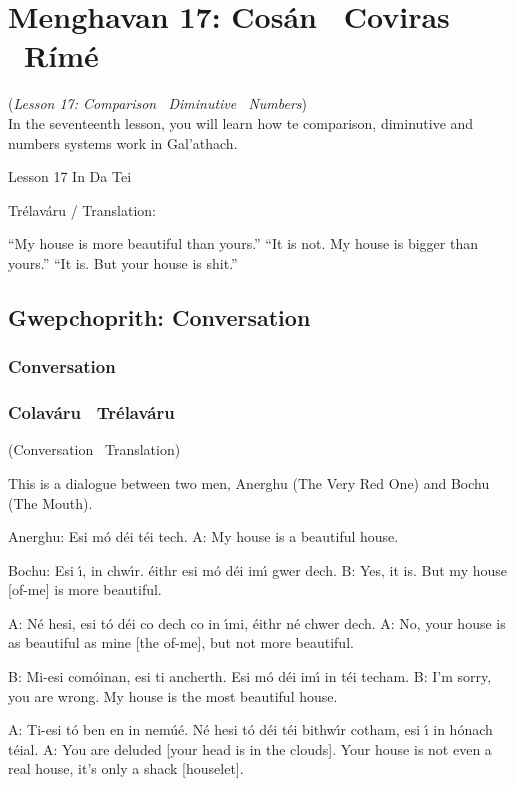 \section{Menghavan 17: Cos\'{a}n \textendash\ Coviras \textendash\ R\'{i}m\'{e}}
(\textit{Lesson 17: Comparison \textendash\ Diminutive \textendash\ Numbers})\\

In the seventeenth lesson, you will learn how te comparison, diminutive and numbers systems work in Gal'{a}thach. 

Lesson 17 In Da Tei

Tr\'{e}lav\'{a}ru / Translation:

``My house is more beautiful than yours.''
``It is not. My house is bigger than yours.''
``It is. But your house is shit.''

\subsection{Gwepchoprith: Conversation}
\subsubsection{Conversation}


\subsubsection{Colav\'{a}ru \textendash\ Tr\'{e}lav\'{a}ru}
(Conversation \textendash\ Translation)

This is a dialogue between two men, Anerghu (The Very Red One) and Bochu (The Mouth).

Anerghu: Esi m\'{o} d\'{e}i t\'{e}i tech.
A: My house is a beautiful house.

Bochu: Esi \'{\i}, in chw\'{\i}r. \'{e}ithr esi m\'{o} d\'{e}i im\'{\i} gwer dech.
B: Yes, it is. But my house [of-me] is more beautiful.

A: N\'{e} hesi, esi t\'{o} d\'{e}i co dech co in \'{\i}mi, \'{e}ithr n\'{e} chwer dech.
A: No, your house is as beautiful as mine [the of-me], but not more beautiful.

B: Mi-esi com\'{o}inan, esi ti ancherth. Esi m\'{o} d\'{e}i im\'{\i} in t\'{e}i techam.
B: I'm sorry, you are wrong. My house is the most beautiful house.

A: Ti-esi t\'{o} ben en in nem\'{u}\'{e}. N\'{e} hesi t\'{o} d\'{e}i t\'{e}i bithw\'{\i}r cotham, esi \'{\i} in h\'{o}nach t\'{e}ial.
A: You are deluded [your head is in the clouds]. Your house is not even a real house, it's only a shack [houselet].

